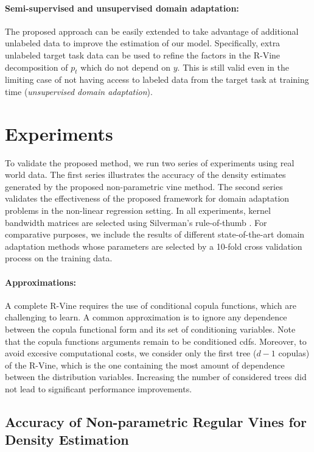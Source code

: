 \documentclass{article}
\begin{document}
\paragraph{Semi-supervised and unsupervised domain adaptation:}
The proposed approach can be easily extended to take advantage of additional
unlabeled data to improve the estimation of our model. Specifically, extra
unlabeled target task data can be used to refine the factors in the R-Vine
decomposition of $p_t$ which do not depend on $y$.  This is still valid even in
the limiting case of not having access to labeled data from the target task at
training time (\emph{unsupervised domain adaptation}).

\section{Experiments}\label{sec:experiments}
To validate the proposed method, we run two series of experiments using real
world data.  The first series illustrates the accuracy of the density estimates
generated by the proposed non-parametric vine method.  The second series
validates the effectiveness of the proposed framework for domain adaptation
problems in the non-linear regression setting.  In all experiments, kernel
bandwidth matrices are selected using Silverman's rule-of-thumb
\cite{silverman}.  For comparative purposes, we include the results of
different state-of-the-art domain adaptation methods whose parameters are
selected by a 10-fold cross validation process on the training data.

\paragraph{Approximations:} A complete R-Vine requires the use of conditional
copula functions, which are challenging to learn.  A common approximation is to
ignore any dependence between the copula functional form and its set of
conditioning variables. Note that the copula functions arguments remain to be
conditioned cdfs. Moreover, to avoid excesive computational costs, we consider
only the first tree ($d-1$ copulas) of the R-Vine, which is the one containing
the most amount of dependence between the distribution variables. Increasing
the number of considered trees did not lead to significant performance
improvements.

\subsection{Accuracy of Non-parametric Regular Vines for Density Estimation}
\label{sec:exp_vines}
\end{document}
